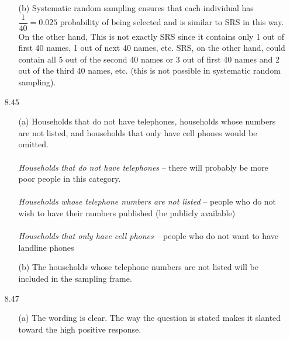 \documentclass[11pt, a4paper]{article}
\begin{document}
\begin{itemize}
\begin{itemize}
\item[]

\item[(b)]
Systematic random sampling ensures that each individual has $\dfrac{1}{40} = 0.025$
probability of being selected and is similar to SRS in this way. On the other hand,
This is not exactly SRS since it contains only 1 out of first 40 names, 1 out of next 40
names, etc. SRS, on the other hand, could contain all 5 out of the second 40 names or
3 out of first 40 names and 2 out of the third 40 names, etc. (this is not possible in
systematic random sampling).
\end{itemize}

\item[]
\item[]

\item[8.45]
\begin{itemize}
\item[(a)]
Households that do not have telephones, households whose
numbers are not listed, and households that only have cell phones
would be omitted.\\\\
\textit{Households that do not have telephones} -- there will probably be more poor people in this category.\\\\
\textit{Households whose telephone numbers are not listed} -- people who do not wish to have their numbers published (be publicly available)\\\\
\textit{Households that only have cell phones} -- people who do not want to have landline phones

\item[]

\item[(b)]
The households whose telephone numbers are not listed will be included in the sampling frame.
\end{itemize}

\item[]
\item[]

\item[8.47]
\begin{itemize}
\item[(a)]
The wording is clear. The way the question is stated makes it slanted toward the high
positive response.

\item[]


\end{itemize}
\end{itemize}
\end{document}

